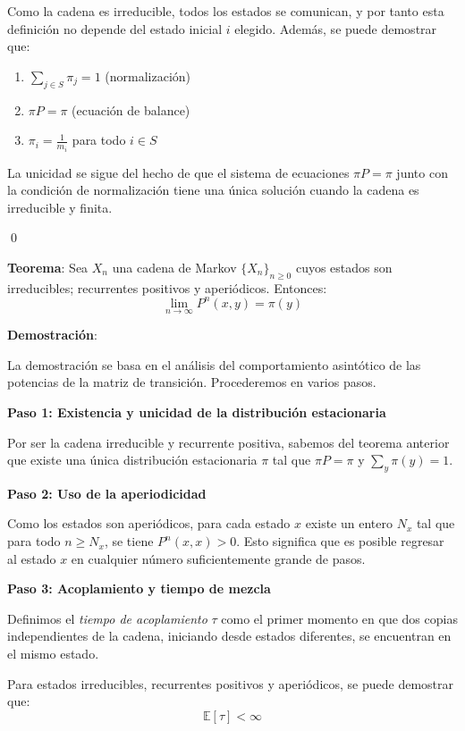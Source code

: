 \documentclass[12pt,a4paper]{article}
\newcommand{\teorema}[1]{%
\begin{teoremabox}
\textbf{Teorema}: #1
\end{teoremabox}
}
\begin{document}
Como la cadena es irreducible, todos los estados se comunican, y por tanto esta definición no depende del estado inicial $i$ elegido. Además, se puede demostrar que:

\begin{enumerate}
\item $\sum_{j \in S} \pi_j = 1$ (normalización)
\item $\pi P = \pi$ (ecuación de balance)
\item $\pi_i = \frac{1}{m_i}$ para todo $i \in S$
\end{enumerate}

La unicidad se sigue del hecho de que el sistema de ecuaciones $\pi P = \pi$ junto con la condición de normalización tiene una única solución cuando la cadena es irreducible y finita.

\qed

\teorema{Sea $X_n$ una cadena de Markov $\{X_n\}_{n \geq 0}$ cuyos estados son irreducibles; recurrentes positivos y aperiódicos. Entonces:
\begin{equation*}
\lim_{n \to \infty} P^n(x,y) = \pi(y)
\end{equation*}}

\textbf{Demostración}:

La demostración se basa en el análisis del comportamiento asintótico de las potencias de la matriz de transición. Procederemos en varios pasos.

\textbf{Paso 1: Existencia y unicidad de la distribución estacionaria}

Por ser la cadena irreducible y recurrente positiva, sabemos del teorema anterior que existe una única distribución estacionaria $\pi$ tal que $\pi P = \pi$ y $\sum_{y} \pi(y) = 1$.

\textbf{Paso 2: Uso de la aperiodicidad}

Como los estados son aperiódicos, para cada estado $x$ existe un entero $N_x$ tal que para todo $n \geq N_x$, se tiene $P^n(x,x) > 0$. Esto significa que es posible regresar al estado $x$ en cualquier número suficientemente grande de pasos.

\textbf{Paso 3: Acoplamiento y tiempo de mezcla}

Definimos el \emph{tiempo de acoplamiento} $\tau$ como el primer momento en que dos copias independientes de la cadena, iniciando desde estados diferentes, se encuentran en el mismo estado.

Para estados irreducibles, recurrentes positivos y aperiódicos, se puede demostrar que:
\begin{equation*}
\mathbb{E}[\tau] < \infty
\end{equation*}
\end{document}
